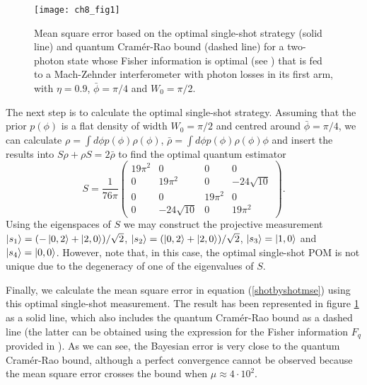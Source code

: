 \begin{figure}[t]
\centering
\texttt{[image: ch8\_fig1]}
	\caption[Shot-by-shot quantum bound with photon losses]{Mean square error based on the optimal single-shot strategy (solid line) and quantum Cram\'{e}r-Rao bound (dashed line) for a two-photon state whose Fisher information is optimal (see \cite{dorner2009}) that is fed to a Mach-Zehnder interferometer with photon losses in its first arm, with $\eta=0.9$, $\bar{\phi} = \pi/4$ and $W_0 = \pi/2$.}
\label{lossy_plot}
\end{figure}

The next step is to calculate the optimal single-shot strategy. Assuming that the prior $p(\phi)$ is a flat density of width $W_0 = \pi/2$ and centred around $\bar{\phi} = \pi/4$, we can calculate $\rho = \int d\phi p(\phi)\rho(\phi)$, $\bar{\rho} = \int d\phi p(\phi)\rho(\phi)\phi$ and insert the results into $S\rho + \rho S = 2\bar{\rho}$ to find the optimal quantum estimator
\begin{equation}
S=\frac{1}{76\pi}
\begin{pmatrix} 
19\pi^2 & 0 & 0 & 0 \\
0 & 19\pi^2 & 0 & -24 \sqrt{10} \\
0 & 0 & 19\pi^2 & 0 \\
0 & -24 \sqrt{10} & 0 & 19\pi^2
\end{pmatrix}.
\end{equation}
Using the eigenspaces of $S$ we may construct the projective measurement $\ket{s_1}=(-\ket{0,2}+\ket{2,0})/\sqrt{2}$, $\ket{s_2}=(\ket{0,2}+\ket{2,0})/\sqrt{2}$, $\ket{s_3}=\ket{1,0}$ and $\ket{s_4}=\ket{0,0}$. However, note that, in this case, the optimal single-shot POM is not unique due to the degeneracy of one of the eigenvalues of $S$.

Finally, we calculate the mean square error in equation (\ref{shotbyshotmse}) using this optimal single-shot measurement. The result has been represented in figure \ref{lossy_plot} as a solid line, which also includes the quantum Cram\'{e}r-Rao bound as a dashed line (the latter can be obtained using the expression for the Fisher information $F_q$ provided in \cite{dorner2009}). As we can see, the Bayesian error is very close to the quantum Cram\'{e}r-Rao bound, although a perfect convergence cannot be observed because the mean square error crosses the bound when $\mu \approx 4 \cdot 10^2$. 

